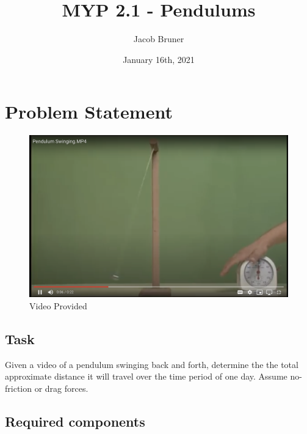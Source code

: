 \documentclass[11pt,a4paper]{article}
\begin{document}
\author{Jacob Bruner}
\title{MYP 2.1 - Pendulums}
\date{January 16th, 2021}
\maketitle
\tableofcontents
\pagebreak

\section{Problem Statement}

\begin{figure}[h]
\begin{center}
\includegraphics[scale=.24]{video.png} 
\caption{Video Provided}
\end{center}
\end{figure}


\subsection{Task}

Given a video of a pendulum swinging back and forth,  determine the the total approximate distance it will travel over the time period of one day.  Assume no-friction or drag forces.

\subsection{Required components}
\end{document}
